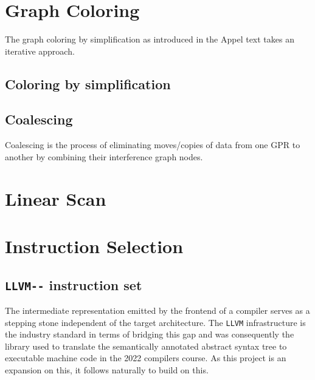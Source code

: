 \documentclass{article}
\begin{document}


\section{Graph Coloring}
The graph coloring by simplification as introduced in the Appel text takes an iterative approach.

\subsection{Coloring by simplification}

\subsection{Coalescing}

Coalescing is the process of eliminating moves/copies of data from one GPR to another by combining their interference graph nodes.

\section{Linear Scan}


\section{Instruction Selection}

\subsection{\lstinline!LLVM--! instruction set}

The intermediate representation emitted by the frontend of a compiler serves as a stepping stone independent of the target architecture. The \lstinline!LLVM! infrastructure is the industry standard in terms of bridging this gap and was consequently the library used to translate the semantically annotated abstract syntax tree to executable machine code in the 2022 compilers course. As this project is an expansion on this, it follows naturally to build on this. 
\end{document}
